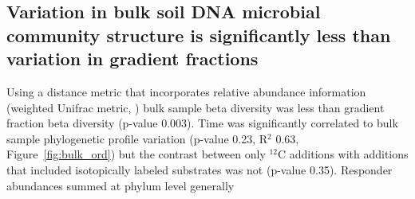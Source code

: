 \subsection{Variation in bulk soil DNA microbial community structure is
significantly less than variation in gradient fractions} 
Using a distance metric that incorporates relative abundance information
(weighted Unifrac metric, \citep{Lozupone_2005}) bulk sample beta diversity was
less than gradient fraction beta diversity (p-value 0.003). Time was
significantly correlated to bulk sample phylogenetic profile variation (p-value
0.23, R$^{2}$ 0.63, Figure~\ref{fig:bulk_ord}) but the contrast between only
$^{12}$C additions with additions that included isotopically labeled substrates
was not (p-value 0.35). Responder abundances summed at phylum level generally 
